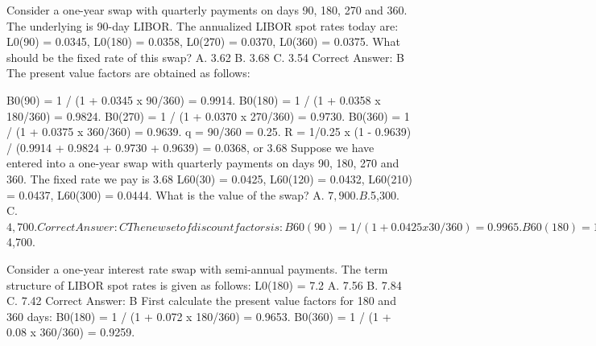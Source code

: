 \documentclass[12pt,a4paper]{exam}
\begin{document}
\begin{questions}

Consider a one-year swap with quarterly payments on days 90, 180, 270 and 360. The underlying is 90-day LIBOR. The annualized LIBOR spot rates today are: L0(90) = 0.0345, L0(180) = 0.0358, L0(270) = 0.0370, L0(360) = 0.0375.
What should be the fixed rate of this swap?
A. 3.62%
B. 3.68%
C. 3.54%
Correct Answer: B
The present value factors are obtained as follows:

B0(90) = 1 / (1 + 0.0345 x 90/360) = 0.9914.
B0(180) = 1 / (1 + 0.0358 x 180/360) = 0.9824.
B0(270) = 1 / (1 + 0.0370 x 270/360) = 0.9730.
B0(360) = 1 / (1 + 0.0375 x 360/360) = 0.9639.
q = 90/360 = 0.25. R = 1/0.25 x (1 - 0.9639) / (0.9914 + 0.9824 + 0.9730 + 0.9639) = 0.0368, or 3.68%
Suppose we have entered into a one-year swap with quarterly payments on days 90, 180, 270 and 360. The fixed rate we pay is 3.68%
L60(30) = 0.0425, L60(120) = 0.0432, L60(210) = 0.0437, L60(300) = 0.0444.
What is the value of the swap?
A. $7,900.
B. $5,300.
C. $4,700.
Correct Answer: C
The new set of discount factors is:
B60(90) = 1 / (1 + 0.0425 x 30/360) = 0.9965.
B60(180) = 1 / (1 + 0.0432 x 120/360) = 0.9858.
B60(270) = 1 / (1 + 0.0437 x 210/360) = 0.9751.
B60(360) = 1 / (1 + 0.0444 x 300/360) = 0.9643.

The present value of the remaining fixed payments of 0.0092 (0.0368/4), including the hypothetical notional principal, is 0.0092 x (0.9965 + 0.9858 + 0.9751 + 0.9643) + 1 x 0.9643 = 1.0004.
As the market value of the remaining payments on day 90, including the hypothetical final notional principal, is 1.0, we discount 1.00 + 0.0086 (which is 0.0345/4) = 1.0086 back 30 days to obtain 1.0086 x 0.9965 = 1.0051.
Therefore, the value of the swap is (1.0051 - 1.0004) x 1,000,000 = $4,700.

Consider a one-year interest rate swap with semi-annual payments. The term structure of LIBOR spot rates is given as follows: L0(180) = 7.2%
A. 7.56%
B. 7.84%
C. 7.42%
Correct Answer: B
First calculate the present value factors for 180 and 360 days:
B0(180) = 1 / (1 + 0.072 x 180/360) = 0.9653.
B0(360) = 1 / (1 + 0.08 x 360/360) = 0.9259.


\end{questions}
\end{document}

